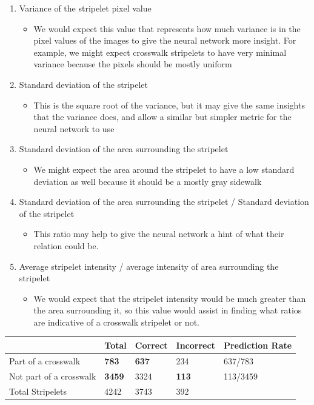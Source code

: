 \documentclass[12pt]{ucthesis}
\begin{document}
{\begin{enumerate}
   \item Variance of the stripelet pixel value
   \begin{itemize}
     \item We would expect this value that represents how much variance is in the pixel values of the images to give the neural network more insight. For example, we might expect crosswalk stripelets to have very minimal variance because the pixels should be mostly uniform
   \end{itemize}
   \item Standard deviation of the stripelet
   \begin{itemize}
     \item This is the square root of the variance, but it may give the same insights that the variance does, and allow a similar but simpler metric for the neural network to use
   \end{itemize}
      \item Standard deviation of the area surrounding the stripelet
   \begin{itemize}
     \item We might expect the area around the stripelet to have a low standard deviation as well because it should be a mostly gray sidewalk
   \end{itemize}
      \item Standard deviation of the area surrounding the stripelet / Standard deviation of the stripelet
   \begin{itemize}
     \item This ratio may help to give the neural network a hint of what their relation could be. 
   \end{itemize}
   \item Average stripelet intensity / average intensity of area surrounding the stripelet
   \begin{itemize}
     \item We would expect that the stripelet intensity would be much greater than the area surrounding it, so this value would assist in finding what ratios are indicative of a crosswalk stripelet or not. 
   \end{itemize}
\end{enumerate}

\begin{center}
    \begin{longtable}{| l | l | l | l | l |}
    \hline
     & Total & Correct & Incorrect & Prediction Rate \\ \hline
    Part of a crosswalk & \textbf{783} & \textbf{637} & 234 & 637/783 \\ \hline
    Not part of a crosswalk & \textbf{3459} & 3324 & \textbf{113} & 113/3459\\ \hline
    Total Stripelets & 4242 & 3743 & 392 & \\ \hline
    

\end{longtable}
\end{center}}
\end{document}
